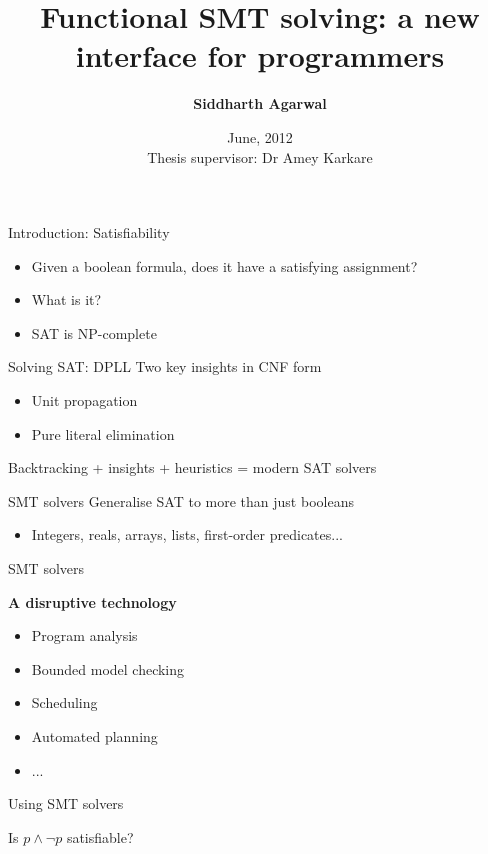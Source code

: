 \documentclass{beamer}
\title[Functional SMT solving]{Functional SMT solving: a new interface for programmers}
\author{\textbf{Siddharth Agarwal}}
\institute{IIT Kanpur, India \\ \texttt{\{sagarwal,karkare\}@cse.iitk.ac.in}}
\date{June, 2012 \\ Thesis supervisor: Dr Amey Karkare}
\begin{document}
\begin{frame}[plain]
  \titlepage
\end{frame}

\begin{frame}{Introduction: Satisfiability}
\begin{itemize}
\item Given a boolean formula, does it have a satisfying assignment?
\pause
\item What is it?
\pause
\item SAT is NP-complete
\end{itemize}
\end{frame}

\begin{frame}{Solving SAT: DPLL}
Two key insights in CNF form
\begin{itemize}
\item Unit propagation
\pause
\item Pure literal elimination
\end{itemize}
\pause
Backtracking + insights + heuristics = modern SAT solvers
\end{frame}

\begin{frame}{SMT solvers}
Generalise SAT to more than just booleans
\begin{itemize}
\item Integers, reals, arrays, lists, first-order predicates...
\end{itemize}
\end{frame}

\begin{frame}{SMT solvers}
\begin{center}
\textbf{A disruptive technology}
\end{center}
\pause
\begin{itemize}
\item Program analysis
\item Bounded model checking
\item Scheduling
\item Automated planning
\item ...
\end{itemize}
\end{frame}

\begin{frame}{Using SMT solvers}

\begin{center}
Is $p \wedge \neg p$ satisfiable?
\end{center}

\end{frame}
\end{document}

